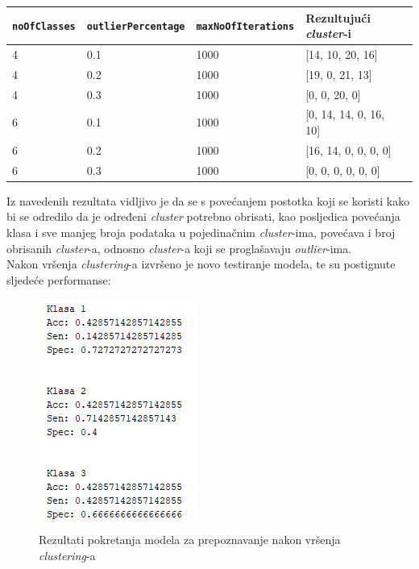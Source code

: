 \documentclass[12pt,a4paper]{article}
\begin{document}
\begin{table}[H]
\centering
\begin{tabular}{|l|l|l|l|l|}
\hline
\textbf{\texttt{noOfClasses}} 		& \textbf{\texttt{outlierPercentage}}   	& \textbf{ \texttt{maxNoOfIterations}} 		& \textbf{Rezultujući \textit{cluster}-i} 		\\ \hline
4            						& 0.1 								& 1000              							& [14, 10, 20, 16]            				   	\\ \hline
4            						& 0.2 								& 1000              							& [19, 0, 21, 13]      				   		\\ \hline
4            						& 0.3 								& 1000              							& [0, 0, 20, 0]          				   		\\ \hline
6           						& 0.1 								& 1000             							& [0, 14, 14, 0, 16, 10]				 	\\ \hline
6           						& 0.2 								& 1000             							& [16, 14, 0, 0, 0, 0] 					 	\\ \hline
6           						& 0.3 								& 1000             							& [0, 0, 0, 0, 0, 0]    					 	\\ \hline
\end{tabular}
\end{table}

Iz navedenih rezultata vidljivo je da se s povećanjem postotka koji se koristi kako bi se odredilo da je određeni \textit{cluster} potrebno obrisati, kao posljedica povećanja klasa i sve manjeg broja podataka u pojedinačnim \textit{cluster}-ima, povećava i broj obrisanih \textit{cluster}-a, odnosno \textit{cluster}-a koji se proglašavaju \textit{outlier}-ima.\\
Nakon vršenja \textit{clustering}-a izvršeno je novo testiranje modela, te su postignute sljedeće performanse:

\begin{figure}[H]

\center
\includegraphics[scale=0.9]{slikaClustering.png}
\caption{Rezultati pokretanja modela za prepoznavanje nakon vršenja \textit{clustering}-a}
	
\end{figure}
\end{document}
